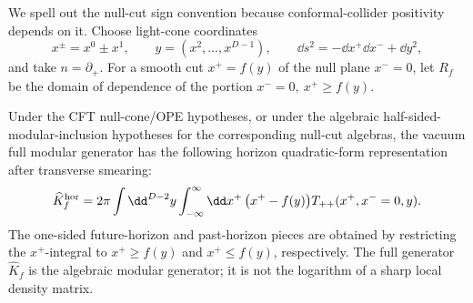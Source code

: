 We spell out the null-cut sign convention because conformal-collider
positivity depends on it.  Choose light-cone coordinates
\[
  x^\pm=x^0\pm x^1,\qquad
  y=(x^2,\ldots,x^{D-1}),\qquad
  \dd s^2=-\dd x^+\dd x^-+\dd y^2,
\]
and take \(n=\partial_+\).  For a smooth cut \(x^+=f(y)\) of the null plane
\(x^-=0\), let \(R_f\) be the domain of dependence of the portion
\(x^-\!=0,\ x^+\geq f(y)\).

\begin{quotedtheorem}
Under the CFT null-cone/OPE hypotheses, or under the algebraic
half-sided-modular-inclusion hypotheses for the corresponding null-cut
algebras, the vacuum full modular generator has the following horizon
quadratic-form representation after transverse smearing:
\begin{equation}
  \widehat K_f^{\rm hor}
  =
  2\pi
  \int\dd^{D-2}y
  \int_{-\infty}^{\infty} \dd x^+\,
  \bigl(x^+-f(y)\bigr)T_{++}(x^+,x^-=0,y).
  \label{eq:null-cut-modular-hamiltonian}
\end{equation}
The one-sided future-horizon and past-horizon pieces are obtained by
restricting the \(x^+\)-integral to \(x^+\geq f(y)\) and
\(x^+\leq f(y)\), respectively.  The full generator
\(\widehat K_f\) is the algebraic modular generator; it is not
the logarithm of a sharp local density matrix.
\end{quotedtheorem}


